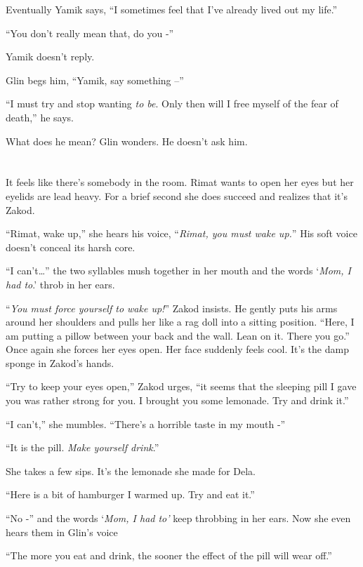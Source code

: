 \documentclass[twoside,11pt]{book}
\begin{document}
Eventually Yamik says, ``I sometimes feel that I've already lived out my life.''

``You don't really mean that, do you -''

Yamik doesn't reply.

Glin begs him, ``Yamik, say something --''

``I must try and stop wanting \textit{to be}. Only then will I free myself of the fear of
death,'' he says.

What does he mean? Glin wonders. He doesn't ask him.


\bigskip

\chapter{}

It feels like there's somebody in the room. Rimat wants to open her eyes but her eyelids are lead heavy. For a brief
second she does succeed and realizes that it's Zakod.

``Rimat, wake up,'' she hears his voice, ``\textit{Rimat, you must wake up.}'' His soft voice
doesn't conceal its harsh core.

``I can't{\dots}'' the two syllables mush together in her mouth and the words `\textit{Mom, I had to}.' throb in her
ears.

``\textit{You must force yourself to wake up!}'' Zakod insists. He gently puts his arms around her
shoulders and pulls her like a rag doll into a sitting position. ``Here, I am putting a pillow between your back and
the wall. Lean on it. There you go.'' Once again she forces her eyes open. Her face suddenly feels cool. It's the damp
sponge in Zakod's hands.

``Try to keep your eyes open,'' Zakod urges, ``it seems that the sleeping pill I gave you was rather strong for you.
I brought you some lemonade. Try and drink it.''

``I can't,'' she mumbles. ``There's a horrible taste in my mouth -''

``It is the pill. \textit{Make yourself drink}.''

She takes a few sips. It's the lemonade she made for Dela.

``Here is a bit of hamburger I warmed up. Try and eat it.''

``No -'' and the words `\textit{Mom, I had to'} keep throbbing in her ears. Now she even hears them in Glin's
voice

``The more you eat and drink, the sooner the effect of the pill will wear off.''
\end{document}
